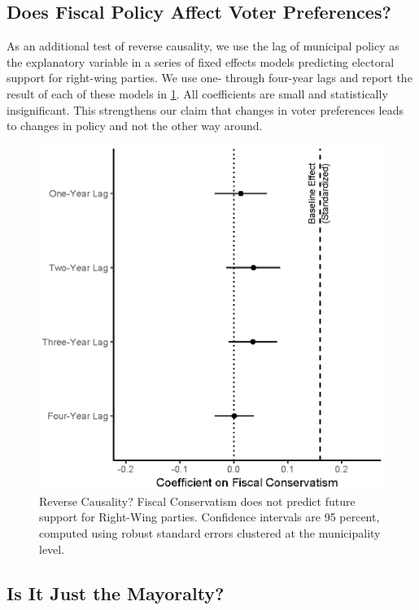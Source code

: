 \documentclass[a4paper,12pt]{article}
\begin{document}
\subsection{Does Fiscal Policy Affect Voter Preferences?}\label{granger}

\setcounter{table}{0}
\setcounter{figure}{0}

As an additional test of reverse causality, we use the lag of municipal policy as the explanatory variable in a series of fixed effects models predicting electoral support for right-wing parties. We use one- through four-year lags and report the result of each of these models in  \ref{fig:granger}. All coefficients are small and statistically insignificant. This strengthens our claim that changes in voter preferences leads to changes in policy and not the other way around.


\begin{figure}[!htb]
	\centering
	\includegraphics[scale = 1]{granger_18092018.eps}
	\caption{Reverse Causality? Fiscal Conservatism does not predict future support for Right-Wing parties. Confidence intervals are 95 percent, computed using robust standard errors clustered at the municipality level.} \label{fig:granger}
\end{figure}
\clearpage
\subsection{Is It Just the Mayoralty?}\label{mechanism}
\end{document}
